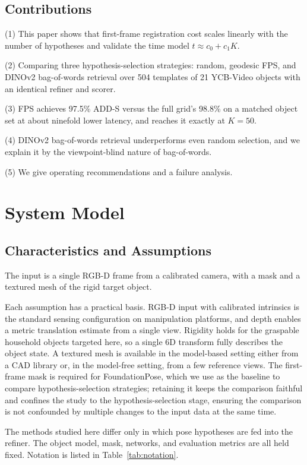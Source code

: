 \documentclass[10pt,twocolumn,letterpaper]{article}
\begin{document}
\subsection{Contributions}
(1) This paper shows that first-frame registration cost scales linearly with the number of hypotheses and validate the time model $t \approx c_0 + c_1K$.

(2) Comparing three hypothesis-selection strategies: random, geodesic FPS, and DINOv2 bag-of-words retrieval over 504 templates of 21 YCB-Video objects with an identical refiner and scorer.

(3) FPS achieves 97.5\% ADD-S versus the full grid's 98.8\% on a matched object set at about ninefold lower latency, and reaches it exactly at $K{=}50$.

(4) DINOv2 bag-of-words retrieval underperforms even random selection, and we explain it by the viewpoint-blind nature of bag-of-words.

(5) We give operating recommendations and a failure analysis.

\section{System Model}

\subsection{Characteristics and Assumptions}
The input is a single RGB-D frame from a calibrated camera, with a mask and a textured mesh of the rigid target object.

Each assumption has a practical basis. RGB-D input with calibrated intrinsics is the standard sensing configuration on manipulation platforms, and depth enables a metric translation estimate from a single view. Rigidity holds for the graspable household objects targeted here, so a single 6D transform fully describes the object state. A textured mesh is available in the model-based setting either from a CAD library or, in the model-free setting, from a few reference views. The first-frame mask is required for FoundationPose, which we use as the baseline to compare hypothesis-selection strategies; retaining it keeps the comparison faithful and confines the study to the hypothesis-selection stage, ensuring the comparison is not confounded by multiple changes to the input data at the same time.

The methods studied here differ only in which pose hypotheses are fed into the refiner. The object model, mask, networks, and evaluation metrics are all held fixed. Notation is listed in Table~\ref{tab:notation}.
\end{document}
